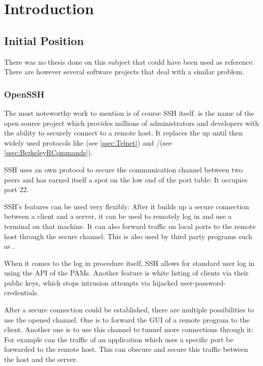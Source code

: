 \documentclass[10pt,a4paper,titlepage,twoside,english,final]{zhawreprt}
\begin{document}
\makedeclarationoforiginality

\tableofcontents

\chapter{Introduction}\label{chp:Introduction}
\section{Initial Position}\label{sec:InitialPosition}
There was no thesis done on this subject that could have been used as reference.
There are however several software projects that deal with a similar problem.

\subsection{OpenSSH}\label{ssec:OpenSSH}
The most noteworthy work to mention is of course \gls{SSH} itself.
\cite{openssh} is the name of the open source project which provides millions of administrators and developers with the ability to securely connect to a remote host.
It replaces the up until then widely used protocols like \cite{telnet}(see \ref{ssec:Telnet}) and \cite{rlogin}/\cite{rsh}(see \ref{ssec:BerkeleyRCommands}).

\gls{SSH} uses an own protocol to secure the communication channel between two peers and has earned itself a spot on the low end of the \gls{port} table: It occupies \gls{port} 22.

\gls{SSH}'s features can be used very flexibly: After it builds up a secure connection between a client and a server, it can be used to remotely log in and use a \gls{terminal} on that machine.
It can also forward traffic on local ports to the remote host through the secure channel.
This is also used by third party programs such as \cite{rsync}.

When it comes to the log in procedure itself, \gls{SSH} allows for standard user log in using the \gls{API} of the \glspl{PAM}.
Another feature is white listing of clients via their public keys, which stops intrusion attempts via hijacked user-password-credentials.

After a secure connection could be established, there are multiple possibilities to use the opened channel.
One is to forward the \gls{GUI} of a remote program to the client.
Another one is to use this channel to tunnel more connections through it: For example can the traffic of an application which uses a specific \gls{port} be forwarded to the remote host.
This can obscure and secure this traffic between the host and the server.
\end{document}
